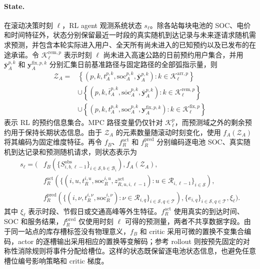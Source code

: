 \documentclass[12pt,a4paper,UTF8]{ctexart}
\begin{document}
\paragraph{State.}
在滚动决策时刻 $\ell$，RL agent 观测系统状态 $s_\ell$。除各站每块电池的 SOC、电价和时间特征外，状态分别保留最近一时段的真实随机到达记录与未来逐请求随机需求预测，并包含本轮实际进入用户、全天所有尚未进入的已知预约以及已发布的在途承诺。令
$\mathcal K_\ell^{\mathrm{rem},p}$ 表示时刻 $\ell$ 尚未进入高速公路的日前预约用户集合，并用 $\bar{\mathbf y}_A^{p,k}$ 和 $\mathbf y_A^{\mathrm{fix},p,k}$ 分别汇集日前基准路径与固定路径的全部弧指示量，则
\begin{equation}
\begin{aligned}
\mathcal Z_{A}
={}&
\left\{
\left(p,k,t_A^{p,k},
\mathrm{soc}_A^{p,k},
\bar{\mathbf y}_A^{p,k}\right):
k\in\mathcal K_\ell^{\mathrm{arr},p}
\right\}\\
&\cup
\left\{
\left(p,k,\bar t_A^{p,k},
\overline{\mathrm{soc}}_A^{p,k},
\bar{\mathbf y}_A^{p,k}\right):
k\in\mathcal K_\ell^{\mathrm{rem},p}
\right\}\\
&\cup
\left\{
\left(p,k,t_A^{p,k},\mathrm{soc}_A^{p,k},
\mathbf y_A^{\mathrm{fix},p,k}\right):
k\in\mathcal K_\ell^{\mathrm{fix},p}
\right\}
\end{aligned}
\label{eq:rl_reservation_information}
\end{equation}
表示 RL 的预约信息集合。MPC 路径变量仍仅针对
$\mathcal K_\ell^p$，而预测域之外的剩余预约用于保持长期状态信息。由于 $\mathcal Z_{A}$ 的元素数量随滚动时刻变化，使用
$f_A(\mathcal Z_{A})$ 将其编码为固定维度特征。再令 $f_B$、$f_R^{\mathrm{act}}$ 和 $f_R^{\mathrm{pred}}$ 分别编码逐电池 SOC、真实随机到达记录和预测随机请求，则状态表示为
\begin{equation}
\begin{aligned}
s_\ell=\Big(&
f_B\!\left(\{S_{i,b,\ell-1}^{\mathrm{obs}}\}_{i\in\mathcal S,b\in\mathcal B_i}\right),
f_A(\mathcal Z_{A}),\\
&
f_R^{\mathrm{act}}\!\left(
\{(i,u,t_R^{i,u},\mathrm{soc}_R^{i,u},z_{R,u,i,\ell-1}^{\mathrm{act}}):
u\in\mathcal R_{i,\ell-1}\}_{i\in\mathcal S}
\right),\\
&
f_R^{\mathrm{pred}}\!\left(
\{(i,\nu,t_{R}^{i,\nu},\mathrm{soc}_{R}^{i,\nu}):
\nu\in\mathcal R_{i,q}\}_{i\in\mathcal S,q\in\mathcal T}
\right),
\{e_{i,q}\}_{i\in\mathcal S,q\in\mathcal T},
\xi_\ell
\Big).
\end{aligned}
\label{eq:rl_state}
\end{equation}
其中 $\xi_\ell$ 表示时段、节假日或交通高峰等外生特征。$f_R^{\mathrm{act}}$ 使用真实的到达时间、SOC 和服务结果，$f_R^{\mathrm{pred}}$ 仅使用时刻 $\ell$ 可得的预测量，两者不共享数据字段。由于同一站点的库存槽标签没有物理意义，$f_B$ 和 critic 采用可微的置换不变集合编码，actor 的逐槽输出采用相应的置换等变解码；参考 rollout 则按预先固定的对称性消除规则将事件分配给槽位。这样的状态既保留逐电池状态信息，也避免任意槽位编号影响策略和 critic 梯度。
\end{document}
